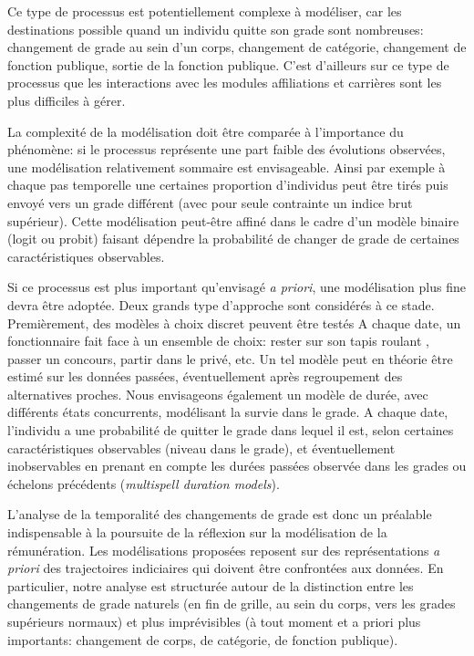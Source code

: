 \documentclass[11pt,a4paper]{article}
\begin{document}
Ce type de processus est potentiellement complexe à modéliser, car les destinations possible quand un individu quitte son grade sont nombreuses: changement de grade au sein d'un corps, changement de catégorie, changement de fonction publique, sortie de la fonction publique. C'est d'ailleurs sur ce type de processus que les interactions avec les modules affiliations et carrières sont les plus difficiles à gérer. 

La complexité de la modélisation doit être comparée à l'importance du phénomène: si le processus représente une part faible des évolutions observées, une modélisation relativement sommaire est envisageable. Ainsi par exemple à chaque pas temporelle une certaines proportion d'individus peut être tirés puis envoyé vers un grade différent (avec pour seule contrainte un indice brut supérieur). Cette modélisation peut-être affiné dans le cadre d'un modèle binaire (logit ou probit) faisant dépendre la probabilité de changer de grade de certaines caractéristiques observables. 

Si ce processus est plus important qu'envisagé \textit{a priori}, une modélisation plus fine devra être adoptée. Deux grands type d'approche sont considérés à ce stade. Premièrement, des modèles à choix discret peuvent être testés A chaque date, un fonctionnaire fait face à un ensemble de choix: rester sur son \og tapis roulant \fg{}, passer un concours, partir dans le privé, etc. Un tel modèle peut en théorie être estimé sur les données passées, éventuellement après regroupement des alternatives proches. Nous envisageons également un modèle de durée, avec différents états concurrents, modélisant la survie dans le grade. A chaque date, l'individu a une probabilité de quitter le grade dans lequel il est, selon certaines caractéristiques observables (niveau dans le grade), et éventuellement inobservables en prenant en compte les durées passées observée dans les grades ou échelons précédents (\textit{multispell duration models}). 


\bigskip

L'analyse de la temporalité des changements de grade est donc un préalable indispensable à la poursuite de la réflexion sur la modélisation de la rémunération. Les modélisations proposées reposent sur des représentations \textit{a priori} des trajectoires indiciaires qui doivent être confrontées aux données. En particulier, notre analyse est structurée autour de la distinction entre les changements de grade \og naturels \fg{} (en fin de grille, au sein du corps, vers les grades supérieurs normaux) et plus imprévisibles (à tout moment et a priori plus importants: changement de corps, de catégorie, de fonction publique).  
\end{document}
